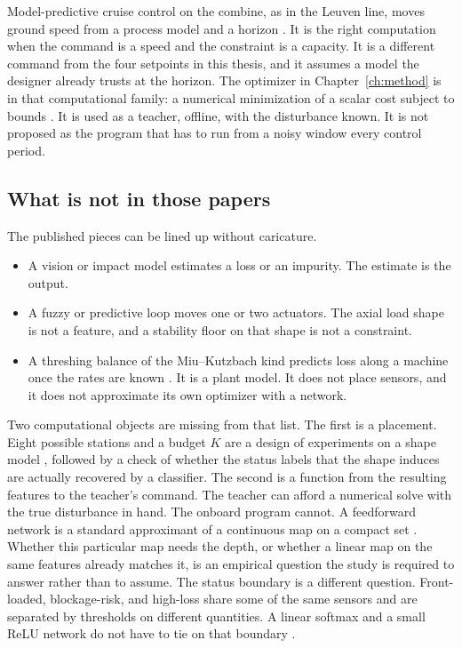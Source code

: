 Model-predictive cruise control on the combine, as in the Leuven line, moves ground speed from a process model and a horizon \cite{coen2008b,rawlings2017}. It is the right computation when the command is a speed and the constraint is a capacity. It is a different command from the four setpoints in this thesis, and it assumes a model the designer already trusts at the horizon. The optimizer in Chapter~\ref{ch:method} is in that computational family: a numerical minimization of a scalar cost subject to bounds \cite{nocedal2006}. It is used as a teacher, offline, with the disturbance known. It is not proposed as the program that has to run from a noisy window every control period.

\subsection{What is not in those papers}

The published pieces can be lined up without caricature.

\begin{itemize}
\item A vision or impact model estimates a loss or an impurity. The estimate is the output.
\item A fuzzy or predictive loop moves one or two actuators. The axial load shape is not a feature, and a stability floor on that shape is not a constraint.
\item A threshing balance of the Miu--Kutzbach kind predicts loss along a machine once the rates are known \cite{miu2008a}. It is a plant model. It does not place sensors, and it does not approximate its own optimizer with a network.
\end{itemize}

Two computational objects are missing from that list. The first is a placement. Eight possible stations and a budget \(K\) are a design of experiments on a shape model \cite{atkinson2007}, followed by a check of whether the status labels that the shape induces are actually recovered by a classifier. The second is a function from the resulting features to the teacher's command. The teacher can afford a numerical solve with the true disturbance in hand. The onboard program cannot. A feedforward network is a standard approximant of a continuous map on a compact set \cite{cybenko1989,hornik1991,goodfellow2016}. Whether this particular map needs the depth, or whether a linear map on the same features already matches it, is an empirical question the study is required to answer rather than to assume. The status boundary is a different question. Front-loaded, blockage-risk, and high-loss share some of the same sensors and are separated by thresholds on different quantities. A linear softmax and a small ReLU network do not have to tie on that boundary \cite{bishop2006,hastie2009}.

